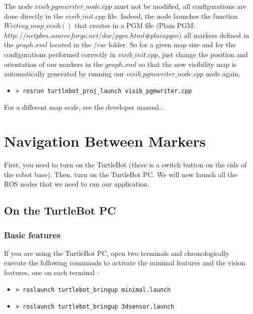 \documentclass[10pt,a4paper]{article}
\begin{document}
The node $ visib\_pgmwriter\_node.cpp $ must not be modified, all configurations are done directly in the $ visib\_init.cpp $ file. Indeed, the node launches the function $ Writing\_map\_visib() $ that creates in a PGM file (Plain PGM: $ http://netpbm.sourceforge.net/doc/pgm.html\#plainpgm $) all markers defined in the $ graph.xml $ located in the $ / rsc $ folder. So for a given map size and for the configurations performed correctly in $ visib\_init.cpp $, just change the position and orientation of our markers in the $ graph.xml $ so that the new visibility map is automatically generated by running our $ visib\_pgmwriter\_node.cpp $ node again. \\

\begin{itemize}
\item[]  \begin{verbatim}> rosrun turtlebot_proj_launch visib_pgmwriter.cpp \end{verbatim}
\end{itemize}

For a different map scale, see the developer manual...

\newpage
\section{Navigation Between Markers}
\label{sec:Navigation Between Markers}

First, you need to turn on the TurtleBot (there is a switch button on the side of the robot base). Then, turn on the TurtleBot PC. We will now launch all the ROS nodes that we need to run our application.

\subsection{On the TurtleBot PC}

\subsubsection{Basic features}

If you are using the TurtleBot PC, open two terminals and chronologically execute the following commands to activate the minimal features and the vision features, one on each terminal :

\begin{itemize}
\item[]  \begin{verbatim}> roslaunch turtlebot_bringup minimal.launch \end{verbatim}
\item[]  \begin{verbatim}> roslaunch turtlebot_bringup 3dsensor.launch \end{verbatim}
\end{itemize}
\end{document}
